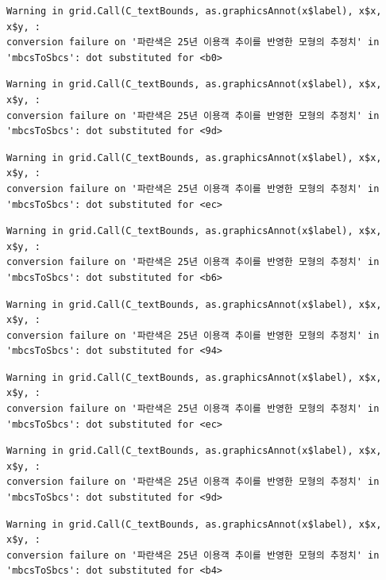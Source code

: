 \documentclass[
  letterpaper,
  DIV=11,
  numbers=noendperiod]{scrreprt}
\begin{document}
\begin{verbatim}
Warning in grid.Call(C_textBounds, as.graphicsAnnot(x$label), x$x, x$y, :
conversion failure on '파란색은 25년 이용객 추이를 반영한 모형의 추정치' in
'mbcsToSbcs': dot substituted for <b0>
\end{verbatim}

\begin{verbatim}
Warning in grid.Call(C_textBounds, as.graphicsAnnot(x$label), x$x, x$y, :
conversion failure on '파란색은 25년 이용객 추이를 반영한 모형의 추정치' in
'mbcsToSbcs': dot substituted for <9d>
\end{verbatim}

\begin{verbatim}
Warning in grid.Call(C_textBounds, as.graphicsAnnot(x$label), x$x, x$y, :
conversion failure on '파란색은 25년 이용객 추이를 반영한 모형의 추정치' in
'mbcsToSbcs': dot substituted for <ec>
\end{verbatim}

\begin{verbatim}
Warning in grid.Call(C_textBounds, as.graphicsAnnot(x$label), x$x, x$y, :
conversion failure on '파란색은 25년 이용객 추이를 반영한 모형의 추정치' in
'mbcsToSbcs': dot substituted for <b6>
\end{verbatim}

\begin{verbatim}
Warning in grid.Call(C_textBounds, as.graphicsAnnot(x$label), x$x, x$y, :
conversion failure on '파란색은 25년 이용객 추이를 반영한 모형의 추정치' in
'mbcsToSbcs': dot substituted for <94>
\end{verbatim}

\begin{verbatim}
Warning in grid.Call(C_textBounds, as.graphicsAnnot(x$label), x$x, x$y, :
conversion failure on '파란색은 25년 이용객 추이를 반영한 모형의 추정치' in
'mbcsToSbcs': dot substituted for <ec>
\end{verbatim}

\begin{verbatim}
Warning in grid.Call(C_textBounds, as.graphicsAnnot(x$label), x$x, x$y, :
conversion failure on '파란색은 25년 이용객 추이를 반영한 모형의 추정치' in
'mbcsToSbcs': dot substituted for <9d>
\end{verbatim}

\begin{verbatim}
Warning in grid.Call(C_textBounds, as.graphicsAnnot(x$label), x$x, x$y, :
conversion failure on '파란색은 25년 이용객 추이를 반영한 모형의 추정치' in
'mbcsToSbcs': dot substituted for <b4>
\end{verbatim}
\end{document}
